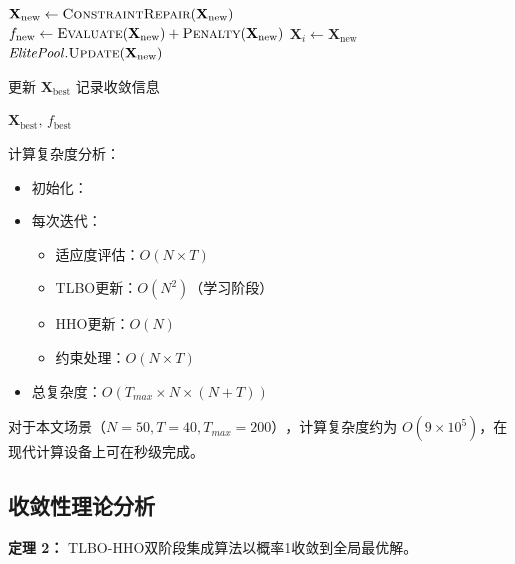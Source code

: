 \documentclass[conference]{IEEEtran}
\begin{document}
\begin{algorithm}[!h]
\begin{algorithmic}[1]
            \STATE $\mathbf{X}_{\text{new}} \leftarrow \textsc{ConstraintRepair}(\mathbf{X}_{\text{new}})$
            \STATE $f_{\text{new}} \leftarrow \textsc{Evaluate}(\mathbf{X}_{\text{new}}) +
                   \textsc{Penalty}(\mathbf{X}_{\text{new}})$
                \STATE $\mathbf{X}_i \leftarrow \mathbf{X}_{\text{new}}$
                \STATE $\mathit{ElitePool}.\textsc{Update}(\mathbf{X}_{\text{new}})$
            \ENDIF
        \ENDFOR

        \STATE 更新 $\mathbf{X}_{\text{best}}$
        \STATE 记录收敛信息
    \ENDFOR

    \RETURN $\mathbf{X}_{\text{best}},\,f_{\text{best}}$
  \end{algorithmic}
\end{algorithm}
计算复杂度分析：
\begin{itemize}
    \item 初始化：
    \item 每次迭代：
    \begin{itemize}
        \item 适应度评估：$O(N \times T)$
        \item TLBO更新：$O(N^2)$（学习阶段）
        \item HHO更新：$O(N)$
        \item 约束处理：$O(N \times T)$
    \end{itemize}
    \item 总复杂度：$O(T_{max} \times N \times (N + T))$
\end{itemize}
对于本文场景$（N=50, T=40, T_{max}=200）$，计算复杂度约为 $O(9 \times 10^5)$，在现代计算设备上可在秒级完成。
\subsection{收敛性理论分析}
\noindent\textbf{定理 2：} TLBO-HHO双阶段集成算法以概率1收敛到全局最优解。
\end{document}
